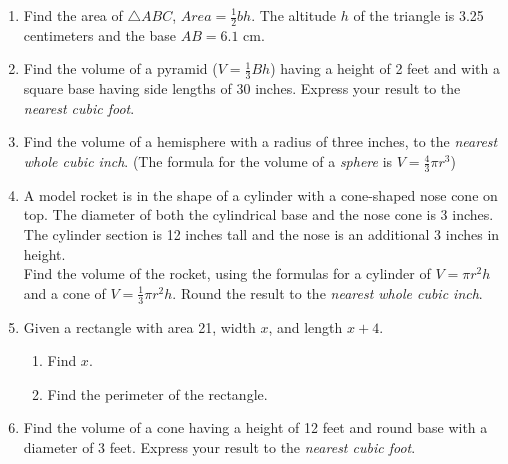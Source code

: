 \begin{enumerate}
\item Find the area of $\triangle ABC$,  $Area= \frac{1}{2}bh$. The altitude $h$ of the triangle is 3.25 centimeters and the base $AB=6.1$ cm.\\[1cm]
    \vspace{2cm}

\item Find the volume of a pyramid ($V=\frac{1}{3}Bh$) having a height of 2 feet and with a square base having side lengths of 30 inches. Express your result to the \emph{nearest cubic foot}. \vspace{5cm}

\item Find the volume of a hemisphere with a radius of three inches, to the \emph{nearest whole cubic inch}. (The formula for the volume of a \emph{sphere} is $V=\frac{4}{3}\pi r^3$)

\newpage
\item A model rocket is in the shape of a cylinder with a cone-shaped nose cone on top. The diameter of both the cylindrical base and the nose cone is 3 inches. The cylinder section is 12 inches tall and the nose is an additional 3 inches in height. \\[0.5cm]
Find the volume of the rocket, using the formulas for a cylinder of $V=\pi r^2 h$ and a cone of $V=\frac{1}{3} \pi r^2 h$. Round the result to the \emph{nearest whole cubic inch}.  \vspace{8cm}

\item Given a rectangle with area 21, width $x$, and length $x+4$.
  \begin{enumerate}
    \item Find $x$. \vspace{4cm}
    \item Find the perimeter of the rectangle.
  \end{enumerate}

\item Find the volume of a cone having a height of 12 feet and round base with a diameter of 3 feet. Express your result to the \emph{nearest cubic foot}. \vspace{5cm}


\end{enumerate}
